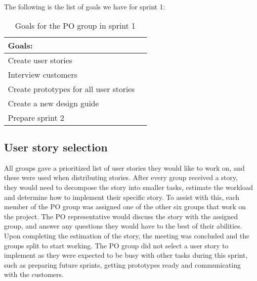 \noindent
The following is the list of goals we have for sprint 1:
\begin{table}[H]
    \centering
    \begin{tabular}{|l|l|}
    \hline
    Goals:                                \\ \hline
    Create user stories                   \\ \hline
    Interview customers                    \\ \hline
    Create prototypes for all user stories \\ \hline
    Create a new design guide                \\ \hline
    Prepare sprint 2                       \\ \hline
    \end{tabular}
    \caption{Goals for the PO group in sprint 1}
    \label{PO-goal-sprint-1}
\end{table}

\subsection{User story selection}
All groups gave a prioritized list of user stories they would like to work on, and these were used when distributing stories.
After every group received a story, they would need to decompose the story into smaller tasks, estimate the workload and determine how to implement their specific story.
To assist with this, each member of the PO group was assigned one of the other six groups that work on the project. 
The PO representative would discuss the story with the assigned group, and answer any questions they would have to the best of their abilities.
Upon completing the estimation of the story, the meeting was concluded and the groups split to start working.
The PO group did not select a user story to implement as they were expected to be busy with other tasks during this sprint, such as preparing future sprints, getting prototypes ready and communicating with the customers.
